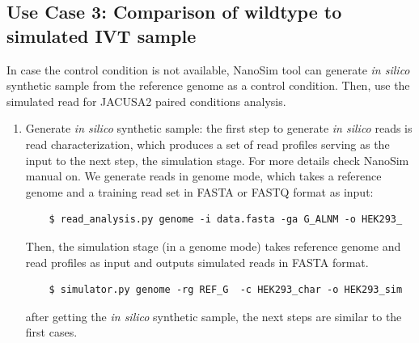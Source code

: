 \documentclass[times, 11pt, a4paper]{article}
\begin{document}
\subsection*{Use Case 3: Comparison of wildtype to simulated IVT sample}
In case the control condition is not available, NanoSim tool can generate  \emph{in silico} synthetic sample from the reference genome as a control condition. Then, use the simulated read for JACUSA2 paired conditions analysis.   
\begin{enumerate}
	\item Generate \emph{in silico} synthetic sample: the first step to generate \emph{in silico} reads is read characterization, which produces a set of read profiles serving as the input to the next step, the simulation stage. For more details check NanoSim manual on. We generate reads in genome mode, which takes a reference genome and a training read set in FASTA or FASTQ format as input:
	\begin{verbatim} 
	$ read_analysis.py genome -i data.fasta -ga G_ALNM -o HEK293_
	\end{verbatim} 		
	Then, the simulation stage (in a genome mode) takes reference genome and read profiles as input and outputs simulated reads in FASTA format.
	\begin{verbatim} 
	$ simulator.py genome -rg REF_G  -c HEK293_char -o HEK293_sim
	\end{verbatim} 	
	after getting the \emph{in silico} synthetic sample, the next steps are similar to the first cases.
	

\end{enumerate}
\end{document}
